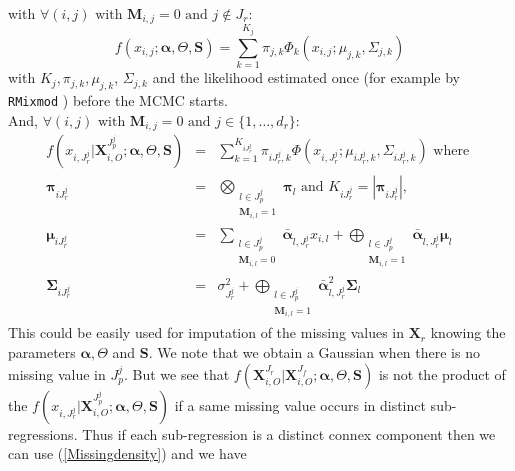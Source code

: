 \documentclass[12pt,a4paper]{report}
\begin{document}
with	  $\forall (i,j) \textrm{ with } \boldsymbol{M}_{i,j}= 0 \textrm{ and } j \notin J_r $:
	 \begin{equation}
	 f(x_{i,j};\boldsymbol{\alpha},\Theta,\boldsymbol{S})=\sum_{k=1}^{K_j}\pi_{j,k}\Phi_k(x_{i,j};\mu_{j,k},\Sigma_{j,k}) \label{likmissdroite}
	 \end{equation} with $K_j,\pi_{j,k}, \mu_{j,k}$, $\Sigma_{j,k}$ and the likelihood estimated once (for example by {\tt RMixmod} \cite{packageRmixmod}) before the MCMC starts. 
\\
	 And, $\forall (i,j) \textrm{ with } \boldsymbol{M}_{i,j}= 0 \textrm{ and } j \in \{1,\dots,d_r \} $:
		\begin{eqnarray}
 f(x_{i,J_r^j}|\boldsymbol{X}_{i,O}^{J_p^j};\boldsymbol{\alpha},\Theta,\boldsymbol{S})&=& \sum_{k=1}^{K_{iJ_r^j}}\pi_{iJ_r^j,k}\Phi(x_{i,J_r^j};\mu_{iJ_r^j,k},\Sigma_{iJ_r^j,k}) \textrm{ where }  \label{Missingdensity}\\
				\boldsymbol{\pi}_{iJ_r^j} &=& \bigotimes_{\substack{l \in J_p^j \\ \boldsymbol{M}_{i,l}=1 } } \boldsymbol{\pi}_l \textrm{ and  }K_{iJ_r^j}=|\boldsymbol{\pi}_{iJ_r^j}| ,\\
				\boldsymbol{\mu}_{iJ_r^j}&=& \sum_{\substack{l \in J_p^j \\ \boldsymbol{M}_{i,l}=0  }}\bar{\boldsymbol{\alpha}}_{l,J_r^j}x_{i,l} + \bigoplus_{\substack{l \in J_p^j \\ \boldsymbol{M}_{i,l}=1  }} \bar{\boldsymbol{\alpha}}_{l,J_r^j} \boldsymbol{\mu}_l \\
				\boldsymbol{\Sigma}_{iJ_r^j} &=& \sigma_{J_r^j}^2 + \bigoplus_{\substack{l \in J_p^j \\ \boldsymbol{M}_{i,l}=1 }}\bar{\boldsymbol{\alpha}}_{l,J_r^j}^2 \boldsymbol{\Sigma}_l		
		\end{eqnarray}		 
		This could be easily used for imputation of the missing values in $\boldsymbol{X}_r$ knowing the parameters $\boldsymbol{\alpha}, \Theta$ and $\boldsymbol{S}$. We note that we obtain a Gaussian when there is no missing value in $J_p^j$.
		But we see that	$f(\boldsymbol{X}^{J_r}_{i,O}|\boldsymbol{X}^{J_f}_{i,O};\boldsymbol{\alpha},\Theta,\boldsymbol{S})$ is not the product of the $f(x_{i,J_r^j}|\boldsymbol{X}_{i,O}^{J_p^j};\boldsymbol{\alpha},\Theta,\boldsymbol{S}) $	if a same missing value occurs in distinct sub-regressions. Thus if each sub-regression is a distinct connex component then we can use (\ref{Missingdensity}) and we have
\end{document}
